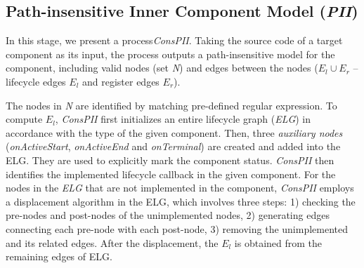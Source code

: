
\subsection{Path-insensitive Inner Component Model (\textit{PII})}
In this stage, we present a process\textit{ConsPII}. Taking the source code of a target component as its input, the process 
outputs a path-insensitive model for the component, including valid nodes (set \textit{N}) and edges between the nodes ($E_{l} \cup E_{r}$ -- lifecycle edges $E_l$ and register edges $E_r$).

The nodes in \textit{N} are identified by matching pre-defined regular expression.
To compute $E_{l}$, \textit{ConsPII} first initializes an entire lifecycle graph (\textit{ELG}) in accordance with the type of the given component. Then, three \textit{auxiliary nodes} (\textit{onActiveStart}, \textit{onActiveEnd} and \textit{onTerminal}) are created and added into the ELG. They are used to explicitly mark the component status. \textit{ConsPII} then identifies the implemented lifecycle callback in the given component. For the nodes in the \textit{ELG} that are not implemented in the component, \textit{ConsPII} employs a displacement algorithm in the ELG, which involves three steps: 1) checking the pre-nodes and post-nodes of the unimplemented nodes, 2) generating edges connecting each pre-node with each post-node, 3) removing the unimplemented and its related edges. After the displacement, the $E_{l}$ is obtained from the remaining edges of ELG. 

